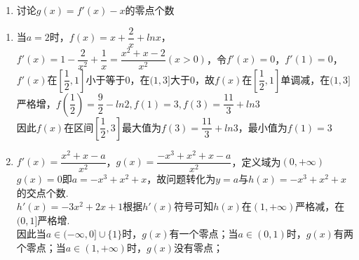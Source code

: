 \begin{enumerate}
\begin{enumerate}
        \item 讨论$g(x) = f'(x) - x$的零点个数
    \end{enumerate}
    \begin{jieda}
        \begin{enumerate}
            \item 当$a = 2$时，$f(x) = x + \dfrac{2}{x} + lnx$，$f'(x) = 1 - \dfrac{2}{x^2} + \dfrac{1}{x} = \dfrac{x^2+x-2}{x^2} (x > 0)$，令$f'(x)=0$，$f'(1) = 0$，$f'(x)$在$\left[\dfrac{1}{2}, 1\right]$小于等于0，在$(1, 3]$大于0，故$f(x)$在$\left[\dfrac{1}{2}, 1\right]$单调减，在$(1, 3]$严格增，$f\left(\dfrac{1}{2}\right) = \dfrac{9}{2} - ln2, f(1) = 3, f(3) = \dfrac{11}{3} + ln3$ \\
            因此$f(x)$在区间$\left[\dfrac{1}{2}, 3\right]$最大值为$f(3) = \dfrac{11}{3} + ln3$，最小值为$f(1) = 3$
            \item $f'(x) = \dfrac{x^2+x-a}{x^2}$，$g(x) = \dfrac{-x^3+x^2+x-a}{x^2}$，定义域为$(0, +\infty)$ \\
            $g(x)=0$即$a=-x^3+x^2+x$，故问题转化为$y=a$与$h(x)=-x^3+x^2+x$的交点个数.\\
            $h'(x)=-3x^2+2x+1$根据$h'(x)$符号可知$h(x)$在$(1,+\infty)$严格减，在$(0,1]$严格增. \\
            因此当$a\in (-\infty,0] \cup \{1\}$时，$g(x)$有一个零点；当$a\in (0, 1)$时，$g(x)$有两个零点；当$a\in (1, +\infty)$时，$g(x)$没有零点；
        \end{enumerate}
    \end{jieda}
\end{enumerate}